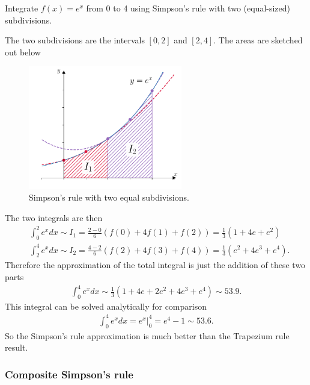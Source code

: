 \exemple{\upline}
{
Integrate $f(x)=e^x$ from 0 to 4 using Simpson's rule with two (equal-sized) subdivisions.

\noindent The two subdivisions are the intervals $[0,2]$ and $[2,4]$. The areas are sketched out below
\begin{figure}[H]
	\begin{center}
	\includegraphics[width=0.6\textwidth]{figures/ch5_simpsons_example.pdf} 
	  \caption{Simpson's rule with two equal subdivisions.} \label{fig:ch5_simpsons_example}
	\end{center}
\end{figure}
\noindent The two integrals are then
\begin{align*}
&\int_0^2 e^x dx \sim I_1 = \frac{2-0}{6} \left(f(0) + 4f(1) + f(2) \right) = \frac{1}{3}\left(1 + 4e + e^2\right) \\
&\int_2^4 e^x dx \sim I_2 = \frac{4-2}{6} \left(f(2) + 4f(3) + f(4) \right) = \frac{1}{3}\left(e^2 + 4e^3 + e^4\right).
\end{align*}
Therefore the approximation of the total integral is just the addition of these two parts
\begin{align*}
\int_0^4 e^x dx \sim \frac{1}{3}\left(1 + 4e + 2e^2 + 4e^3 + e^4\right) \sim 53.9.
\end{align*}
This integral can be solved analytically for comparison
\begin{align*}
\int_0^4 e^x dx = \left. e^x\right|_0^4 = e^4 - 1 \sim 53.6.
\end{align*}
So the Simpson's rule approximation is much better than the Trapezium rule result.
}{\downline}

\subsubsection{Composite Simpson's rule}

